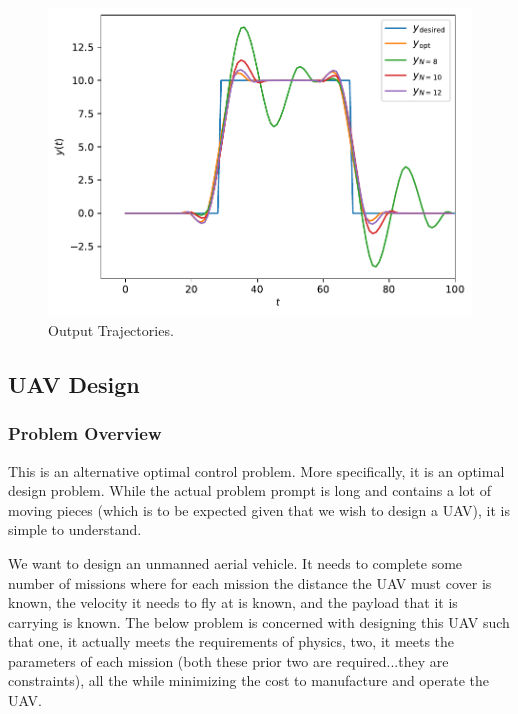 \documentclass[12pt,reqno]{article}
\theoremstyle{definition}
\numberwithin{equation}{section}
\begin{document}
    \begin{figure}[htbp]
        \centering
        \includegraphics[width=\linewidth]{../examples/364b/364b_mpc_output.pdf}
        \caption{Output Trajectories.}
        \label{fig:364-hw7-traj-out}
    \end{figure}

\newpage
\subsection{UAV Design}

\subsubsection*{Problem Overview}
This is an alternative optimal control problem. More specifically, it is an optimal design problem.
While the actual problem prompt is long and contains a lot of moving pieces (which is to be expected
given that we wish to design a UAV), it is simple to understand.

\noindent We want to design an unmanned aerial vehicle. It needs to complete some number of missions
where for each mission the distance the UAV must cover is known, the velocity it needs to fly at
is known, and the payload that it is carrying is known. The below problem is concerned with
designing this UAV such that one, it actually meets the requirements of physics, two, it meets
the parameters of each mission (both these prior two are required...they are constraints), all the
while minimizing the cost to manufacture and operate the UAV.
\end{document}
